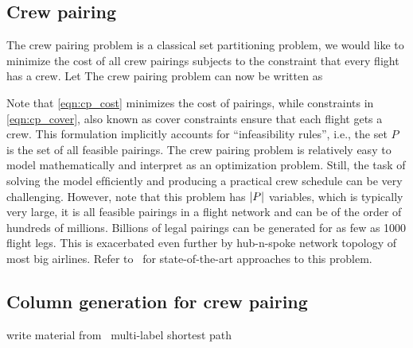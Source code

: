 \documentclass[letterpaper, 10pt, twocolumn, reqno]{amsart}
\begin{document}
\subsection{Crew pairing}
\label{ssec:crew_pairing}

The crew pairing problem is a classical set partitioning problem, we would like to minimize the cost of all crew pairings subjects to the constraint that every flight has a crew. Let
The crew pairing problem can now be written as

Note that \eqref{eqn:cp_cost} minimizes the cost of pairings, while constraints in \eqref{eqn:cp_cover}, also known as cover constraints ensure that each flight gets a crew. This formulation implicitly accounts for ``infeasibility rules'', i.e., the set $P$ is the set of all feasible pairings.
The crew pairing problem is relatively easy to
model mathematically and interpret as an optimization problem. Still, the task of solving the model efﬁciently and producing a practical crew schedule can be very challenging. However, note that this problem has $\left| P \right|$ variables, which is typically very large, it is all feasible pairings in a flight network and can be of the order of hundreds of millions. Billions of legal pairings can be generated for as few as 1000 flight legs. This is exacerbated even further by hub-n-spoke network topology of most big airlines. Refer to~\cite{} for state-of-the-art approaches to this problem.

\subsection{Column generation for crew pairing}
\label{ssec:col_gen_cp}
write material from~\cite{gopalakrishnan2005airline}
multi-label shortest path
\end{document}
